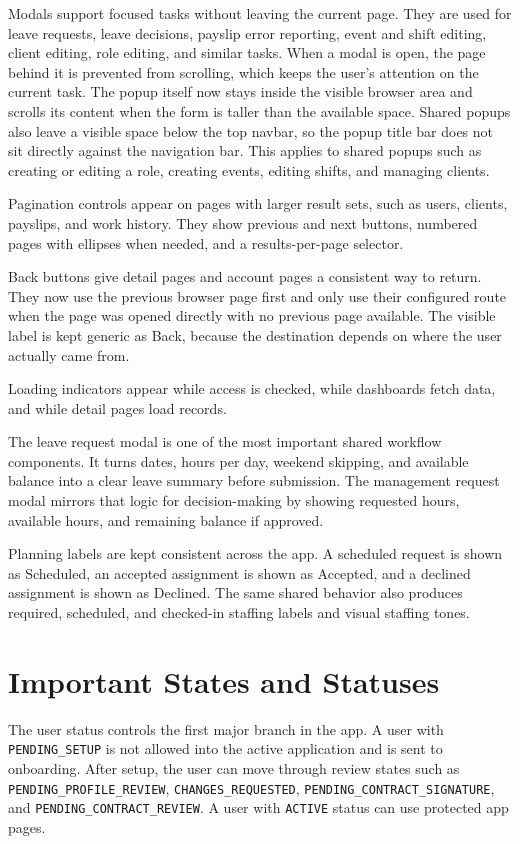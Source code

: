 \documentclass[11pt]{article}
\newcommand{\code}[1]{\nolinkurl{#1}}
\begin{document}
Modals support focused tasks without leaving the current page. They are used for leave requests, leave decisions, payslip error reporting, event and shift editing, client editing, role editing, and similar tasks. When a modal is open, the page behind it is prevented from scrolling, which keeps the user's attention on the current task. The popup itself now stays inside the visible browser area and scrolls its content when the form is taller than the available space. Shared popups also leave a visible space below the top navbar, so the popup title bar does not sit directly against the navigation bar. This applies to shared popups such as creating or editing a role, creating events, editing shifts, and managing clients.

Pagination controls appear on pages with larger result sets, such as users, clients, payslips, and work history. They show previous and next buttons, numbered pages with ellipses when needed, and a results-per-page selector.

Back buttons give detail pages and account pages a consistent way to return. They now use the previous browser page first and only use their configured route when the page was opened directly with no previous page available. The visible label is kept generic as Back, because the destination depends on where the user actually came from.

Loading indicators appear while access is checked, while dashboards fetch data, and while detail pages load records.

The leave request modal is one of the most important shared workflow components. It turns dates, hours per day, weekend skipping, and available balance into a clear leave summary before submission. The management request modal mirrors that logic for decision-making by showing requested hours, available hours, and remaining balance if approved.

Planning labels are kept consistent across the app. A scheduled request is shown as Scheduled, an accepted assignment is shown as Accepted, and a declined assignment is shown as Declined. The same shared behavior also produces required, scheduled, and checked-in staffing labels and visual staffing tones.

\section{Important States and Statuses}

The user status controls the first major branch in the app. A user with \code{PENDING_SETUP} is not allowed into the active application and is sent to onboarding. After setup, the user can move through review states such as \code{PENDING_PROFILE_REVIEW}, \code{CHANGES_REQUESTED}, \code{PENDING_CONTRACT_SIGNATURE}, and \code{PENDING_CONTRACT_REVIEW}. A user with \code{ACTIVE} status can use protected app pages.
\end{document}
